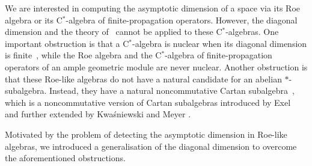 \documentclass[a4paper]{amsart}
\newcommand{\myhyp}{\textnormal{-}\hskip0pt\relax}
\numberwithin{equation}{section}
\newcommand{\cstar}{C$^\ast$\myhyp{}algebra}
\theoremstyle{plain}
\theoremstyle{indented}
\numberwithin{equation}{section}
\theoremstyle{definition}
\theoremstyle{remark}
\theoremstyle{plain}
\theoremstyle{definition}
\begin{document}
We are interested in computing the asymptotic dimension of a space via its Roe algebra or its \cstar{} of finite\myhyp{}propagation operators.
However, the diagonal dimension and the theory of~\cite{LiLiaoWinter2023diagDim} cannot be applied to these \cstar{}s. 
One important obstruction is that 
a \cstar{} is nuclear when its diagonal dimension is finite~\cite{LiLiaoWinter2023diagDim},
while the Roe algebra and the \cstar{} of finite\myhyp{}propagation operators 
of an ample geometric module are never nuclear.
Another obstruction is that these Roe\myhyp{}like algebras do not have a natural candidate for an abelian $\ast$\myhyp{}subalgebra.
Instead, they have a natural noncommutative Cartan subalgebra~\cite{MartinezVigolo2023RoeViaMods}, which is a noncommutative version of Cartan subalgebras introduced by Exel~\cite{Exel2011noncommCartan}
and further extended by Kwa\'{s}niewski and Meyer \cite{KwasniewskiMeyer2020NoncommutativeCartan}.



Motivated by the problem of detecting the asymptotic dimension in Roe\myhyp{}like algebras,
we introduced a generalisation of the diagonal dimension to overcome the aforementioned obstructions.
\end{document}
